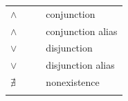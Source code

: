 \documentclass[9pt,letterpaper,twoside]{extarticle}
\begin{document}
\begin{longtable}{@{}p{}p{}p{}p{}@{}}
\addlinespace[.2em]
$\land$ & \texttt{\detokenize{\aand}} & \texttt{\detokenize{\land}} & conjunction \\
\addlinespace[.2em]
$\land$ & \texttt{\detokenize{\conjunction}} & \texttt{\detokenize{\land}} & conjunction alias \\
\addlinespace[.2em]
$\lor$ & \texttt{\detokenize{\oor}} & \texttt{\detokenize{\lor}} & disjunction \\
\addlinespace[.2em]
$\lor$ & \texttt{\detokenize{\disjunction}} & \texttt{\detokenize{\lor}} & disjunction alias \\
\addlinespace[.2em]
$\nexists$ & \texttt{\detokenize{\notexists}} & \texttt{\detokenize{\nexists}} & nonexistence \\
\addlinespace[.2em]
\bottomrule
\end{longtable}
\end{document}
